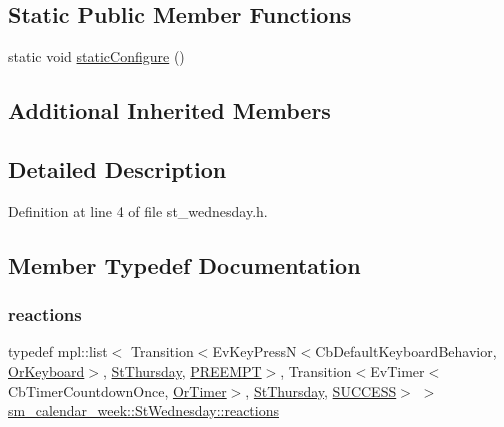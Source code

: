\subsection*{Static Public Member Functions}
\begin{DoxyCompactItemize}
\item 
static void \hyperlink{structsm__calendar__week_1_1StWednesday_a5e641d0acc42524bac18647f6ab02278}{static\+Configure} ()
\end{DoxyCompactItemize}
\subsection*{Additional Inherited Members}


\subsection{Detailed Description}


Definition at line 4 of file st\+\_\+wednesday.\+h.



\subsection{Member Typedef Documentation}
\mbox{\label{structsm__calendar__week_1_1StWednesday_aa21e502e00fa09b841f8693bdb05e86d}} 
\subsubsection{\texorpdfstring{reactions}{reactions}}
{\footnotesize\ttfamily typedef mpl\+::list$<$ Transition$<$Ev\+Key\+PressN$<$Cb\+Default\+Keyboard\+Behavior, \hyperlink{classsm__calendar__week_1_1OrKeyboard}{Or\+Keyboard}$>$, \hyperlink{structsm__calendar__week_1_1StThursday}{St\+Thursday}, \hyperlink{classPREEMPT}{P\+R\+E\+E\+M\+PT}$>$, Transition$<$Ev\+Timer$<$Cb\+Timer\+Countdown\+Once, \hyperlink{classsm__calendar__week_1_1OrTimer}{Or\+Timer}$>$, \hyperlink{structsm__calendar__week_1_1StThursday}{St\+Thursday}, \hyperlink{classSUCCESS}{S\+U\+C\+C\+E\+SS}$>$ $>$ \hyperlink{structsm__calendar__week_1_1StWednesday_aa21e502e00fa09b841f8693bdb05e86d}{sm\+\_\+calendar\+\_\+week\+::\+St\+Wednesday\+::reactions}}



